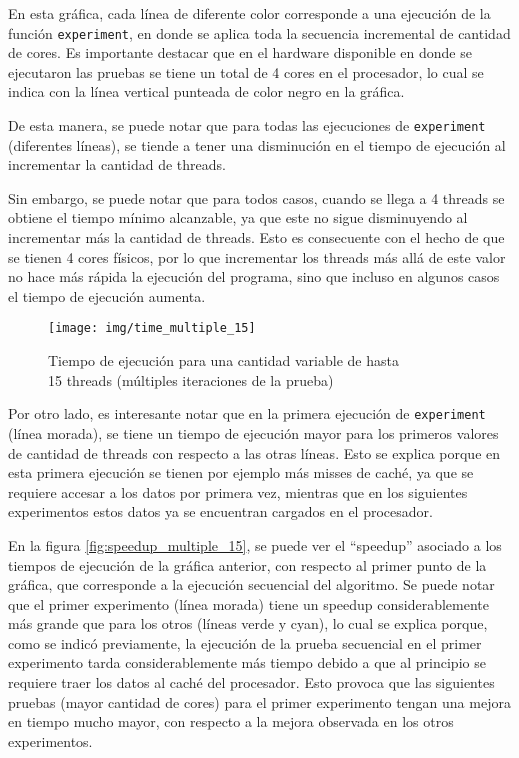 \documentclass {article}
\begin{document}
En esta gráfica, cada línea de diferente color corresponde a una ejecución de la función
\texttt{experiment}, en donde se aplica toda la secuencia incremental de cantidad de cores. Es
importante destacar que en el hardware disponible en donde se ejecutaron las pruebas se tiene un
total de 4 cores en el procesador, lo cual se indica con la línea vertical punteada de color negro
en la gráfica. 

De esta manera, se puede notar que para todas las ejecuciones de \texttt{experiment} (diferentes
líneas), se tiende a tener una disminución en el tiempo de ejecución al incrementar la cantidad de
threads. 

Sin embargo, se puede notar que para todos casos, cuando se llega a 4 threads se obtiene el tiempo
mínimo alcanzable, ya que este no sigue disminuyendo al incrementar más la cantidad de threads. Esto
es consecuente con el hecho de que se tienen 4 cores físicos, por lo que incrementar los threads más
allá de este valor no hace más rápida la ejecución del programa, sino que incluso en algunos casos
el tiempo de ejecución aumenta.

\begin{figure}[H]
  \centering
  \texttt{[image: img/time\_multiple\_15]}
  \caption{\label{fig:time_multiple_15}Tiempo de ejecución para una cantidad variable de hasta \\15 threads (múltiples
    iteraciones de la prueba)}
\end{figure}

Por otro lado, es interesante notar que en la primera ejecución de \texttt{experiment} (línea
morada), se tiene un tiempo de ejecución mayor para los primeros valores de cantidad de threads con
respecto a las otras líneas. Esto se explica porque en esta primera ejecución se tienen por ejemplo
más misses de caché, ya que se requiere accesar a los datos por primera vez, mientras que en los
siguientes experimentos estos datos ya se encuentran cargados en el procesador.

En la figura \ref{fig:speedup_multiple_15}, se puede ver el ``speedup'' asociado a los tiempos de
ejecución de la gráfica anterior, con respecto al primer punto de la gráfica, que corresponde a la
ejecución secuencial del algoritmo. Se puede notar que el primer experimento (línea morada) tiene un
speedup considerablemente más grande que para los otros (líneas verde y cyan), lo cual se explica
porque, como se indicó previamente, la ejecución de la prueba secuencial en el primer experimento
tarda considerablemente más tiempo debido a que al principio se requiere traer los datos al caché
del procesador. Esto provoca que las siguientes pruebas (mayor cantidad de cores) para el primer
experimento tengan una mejora en tiempo mucho mayor, con respecto a la mejora observada en los otros
experimentos.
\end{document}
